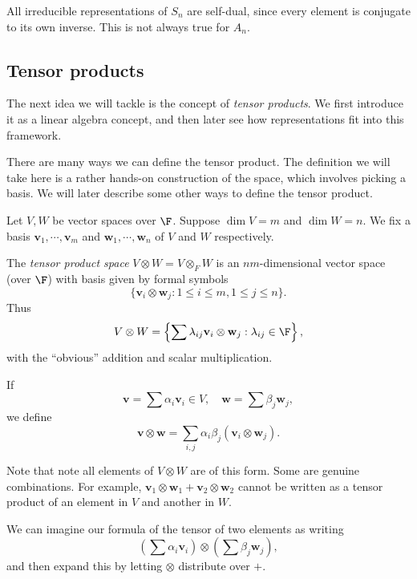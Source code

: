 \documentclass[a4paper]{article}
\begin{document}
\begin{eg}
  All irreducible representations of $S_n$ are self-dual, since every element is conjugate to its own inverse. This is not always true for $A_n$.
\end{eg}

\subsection{Tensor products}
The next idea we will tackle is the concept of \emph{tensor products}. We first introduce it as a linear algebra concept, and then later see how representations fit into this framework.

There are many ways we can define the tensor product. The definition we will take here is a rather hands-on construction of the space, which involves picking a basis. We will later describe some other ways to define the tensor product.

\begin{defi}
  Let $V, W$ be vector spaces over $\F$. Suppose $\dim V = m$ and $\dim W = n$. We fix a basis $\mathbf{v}_1, \cdots, \mathbf{v}_m$ and $\mathbf{w}_1, \cdots, \mathbf{w}_n$ of $V$ and $W$ respectively.

  The \emph{tensor product space} $V \otimes W = V\otimes_F W$ is an $nm$-dimensional vector space (over $\F$) with basis given by formal symbols
  \[
    \{\mathbf{v}_i \otimes \mathbf{w}_j: 1\leq i \leq m, 1 \leq j \leq n\}.
  \]
  Thus
  \[
    V\otimes W = \left\{\sum \lambda_{ij} \mathbf{v}_i \otimes \mathbf{w}_j: \lambda_{ij} \in \F\right\},
  \]
  with the ``obvious'' addition and scalar multiplication.

  If
  \[
    \mathbf{v} = \sum \alpha_i \mathbf{v}_i \in V, \quad \mathbf{w} = \sum \beta_j \mathbf{w}_j,
  \]
  we define
  \[
    \mathbf{v} \otimes \mathbf{w} = \sum_{i, j} \alpha_i\beta_j (\mathbf{v}_i \otimes \mathbf{w}_j).
  \]
\end{defi}
Note that note all elements of $V\otimes W$ are of this form. Some are genuine combinations. For example, $\mathbf{v}_1 \otimes \mathbf{w}_1 + \mathbf{v}_2 \otimes \mathbf{w}_2$ cannot be written as a tensor product of an element in $V$ and another in $W$.

We can imagine our formula of the tensor of two elements as writing
\[
  \left(\sum \alpha_i \mathbf{v}_i\right) \otimes \left(\sum \beta_j \mathbf{w}_j\right),
\]
and then expand this by letting $\otimes$ distribute over $+$.
\end{document}
